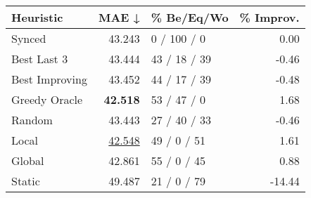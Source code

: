 \begin{tabular}{lrlr}
\toprule
\textbf{Heuristic} & \textbf{MAE ↓} & \textbf{\% Be/Eq/Wo} & \textbf{\% Improv.} \\
\midrule
            Synced &         43.243 &          0 / 100 / 0 &                0.00 \\
\midrule
       Best Last 3 &         43.444 &         43 / 18 / 39 &               -0.46 \\
    Best Improving &         43.452 &         44 / 17 / 39 &               -0.48 \\
\addlinespace
     Greedy Oracle &         \textbf{42.518} &          53 / 47 / 0 &                1.68 \\
            Random &         43.443 &         27 / 40 / 33 &               -0.46 \\
\midrule
             Local &         \underline{42.548} &          49 / 0 / 51 &                1.61 \\
            Global &         42.861 &          55 / 0 / 45 &                0.88 \\
\midrule
            Static &         49.487 &          21 / 0 / 79 &              -14.44 \\
\bottomrule
\end{tabular}

\label{tab:iid_lr05_le2_bs4_Summary}
